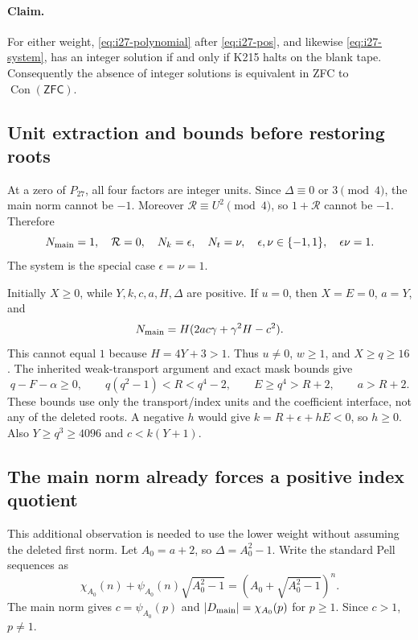 \paragraph{Claim.}
For either weight, \eqref{eq:i27-polynomial} after
\eqref{eq:i27-pos}, and likewise \eqref{eq:i27-system}, has an integer
solution if and only if K215 halts on the blank tape. Consequently the
absence of integer solutions is equivalent in ZFC to
$\operatorname{Con}(\mathsf{ZFC})$.

\subsection{Unit extraction and bounds before restoring roots}

At a zero of $P_{27}$, all four factors are integer units. Since
$\Delta\equiv0$ or $3\pmod4$, the main norm cannot be $-1$.
Moreover $\mathcal R\equiv U^2\pmod4$, so $1+\mathcal R$ cannot be
$-1$. Therefore
\begin{equation}
 N_{\rm main}=1,\quad \mathcal R=0,\quad
 N_k=\epsilon,\quad N_t=\nu,\quad
 \epsilon,\nu\in\{-1,1\},\quad\epsilon\nu=1.
 \label{eq:i27-units}
\end{equation}
The system is the special case $\epsilon=\nu=1$.

Initially $X\ge0$, while $Y,k,c,a,H,\Delta$ are positive. If $u=0$,
then $X=E=0$, $a=Y$, and
\[
 N_{\rm main}
   =H(2ac\gamma+\gamma^2H-c^2).
\]
This cannot equal $1$ because $H=4Y+3>1$. Thus $u\ne0$, $w\ge1$,
and $X\ge q\ge16$. The inherited weak-transport argument and exact
mask bounds give
\begin{equation}
 q-F-\alpha\ge0,\qquad
 q(q^2-1)<R<q^4-2,\qquad E\ge q^4>R+2,
 \qquad a>R+2.
 \label{eq:i27-outer}
\end{equation}
These bounds use only the transport/index units and the coefficient
interface, not any of the deleted roots. A negative $h$ would give
$k=R+\epsilon+hE<0$, so $h\ge0$. Also $Y\ge q^3\ge4096$ and
$c<k(Y+1)$.

\subsection{The main norm already forces a positive index quotient}

This additional observation is needed to use the lower weight without
assuming the deleted first norm. Let $A_0=a+2$, so
$\Delta=A_0^2-1$. Write the standard Pell sequences as
\[
 \chi_{A_0}(n)+\psi_{A_0}(n)\sqrt{A_0^2-1}
   =(A_0+\sqrt{A_0^2-1})^n.
\]
The main norm gives
$c=\psi_{A_0}(p)$ and $|D_{\rm main}|=\chi_{A_0}(p)$ for $p\ge1$.
Since $c>1$, $p\ne1$.


